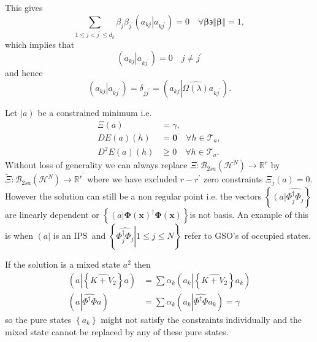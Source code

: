 \documentclass[aps,preprint]{revtex4}%
\begin{document}
This gives
\begin{equation}
\sum_{1\leq j<j^{\prime}\leq d_{k}}\beta_{j}\beta_{j^{\prime}}\left(  \left.
\overset{}{a_{kj}}\right\vert a_{kj^{\prime}}\right)  =0\quad\forall
\mathbf{\beta\backepsilon}\left\Vert \mathbf{\beta}\right\Vert =1,
\end{equation}
which implies that
\begin{equation}
\left(  \left.  \overset{}{a_{kj}}\right\vert a_{kj^{\prime}}\right)  =0\quad
j\neq j^{\prime}%
\end{equation}
and hence
\begin{equation}
\left(  \left.  \overset{}{a_{kj}}\right\vert a_{kj^{\prime}}\right)
=\delta_{jj^{\prime}}=\left(  a_{kj}\left\vert \widehat{\Omega\left(
\lambda\right)  }\right.  a_{kj^{\prime}}\right)  .
\end{equation}


Let $\left\vert \overset{}{a}\right)  $ be a constrained minimum i.e.
\begin{align}
\Xi\left(  a\right)   &  =\gamma,\nonumber\\
DE\left(  a\right)  \left(  h\right)   &  =\mathbf{0}\quad\forall
h\in\mathcal{T}_{a},\nonumber\\
D^{2}E\left(  a\right)  \left(  h\right)   &  \geq0\quad\forall h\in
\mathcal{T}_{a}.
\end{align}
Without loss of generality we can always replace $\Xi:\mathcal{B}_{2sa}\left(
\mathcal{H}^{N}\right)  \rightarrow\mathbb{R}^{r}$ by $\tilde{\Xi}%
:\mathcal{B}_{2sa}\left(  \mathcal{H}^{N}\right)  \rightarrow\mathbb{R}%
^{r^{\prime}}$ where we have excluded $r-r^{\prime}$ zero constraints $\Xi
_{j}\left(  a\right)  =0.$ However the solution can still be a non regular
point i.e. the vectors $\left\{  \left(  \overset{}{a}\right\vert
\widehat{\Phi_{j}^{\dagger}\Phi_{j}}\right\}  $ are linearly dependent or
$\left\{  \left(  \overset{}{a}\right\vert \mathbf{\Phi}\left(  \mathbf{x}%
\right)  ^{\dagger}\mathbf{\Phi}\left(  \mathbf{x}\right)  \right\}  $is not
basis. An example of this is when $\left(  a\right\vert $ is an IPS\ and
$\left\{  \left.  \widehat{\Phi_{j}^{\dagger}\Phi_{j}}\right\vert 1\leq j\leq
N\right\}  $ refer to GSO's of occupied states.

If the solution is a mixed state $a^{2}$ then
\begin{align}
\left(  a\left\vert \left\{  \widehat{K+V_{2}}\right\}  \right.  a\right)   &
=\sum\alpha_{k}\left(  a_{k}\left\vert \left\{  \widehat{K+V_{2}}\right\}
\right.  a_{k}\right) \nonumber\\
\left(  a\left\vert \widehat{\Phi^{\dagger}\Phi}\right.  a\right)   &
=\sum\alpha_{k}\left(  a_{k}\left\vert \widehat{\Phi^{\dagger}\Phi}\right.
a_{k}\right)  =\gamma
\end{align}
so the pure states $\left\{  a_{k}\right\}  $ might not satisfy the
constraints individually and the mixed state cannot be replaced by any of
these pure states.
\end{document}
